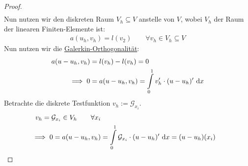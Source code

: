 \documentclass[12pt,a4paper]{article}
\newcommand{\G}{\mathcal{G}}
\begin{document}
\begin{proof}
\begin{align*}
\end{align*}
Nun nutzen wir den diskreten Raum $V_h\subseteq V$ anstelle von $V$, wobei $V_h$ der Raum der linearen Finiten-Elemente ist:
\begin{align*}
a(u_h,v_h)=l(v_2)\qquad\forall v_h\in V_h\subseteq V
\end{align*}
Nun nutzen wir die \ul{Galerkin-Orthogonalität}:
\begin{align*}
a(u-u_h,v_h)
&=l(v_h)-l(v_h)=0\\
\implies 0
&=a(u-u_h,v_h)
=\int\limits_0^1 v_h'\cdot(u-u_h)'\text{ d} x
\end{align*}
Betrachte die diskrete Testfunktion $v_h:=\G_{x_i}$.
\begin{align*}
v_h=\G_{x_i}\in V_h\qquad\forall x_i\\
\implies
0=a(u-u_h,v_h)
&=\int\limits_0^1\G_{x_i}\cdot(u-u_h)'\d x=(u-u_h)(x_i)
\end{align*}
\end{proof}
\end{document}
